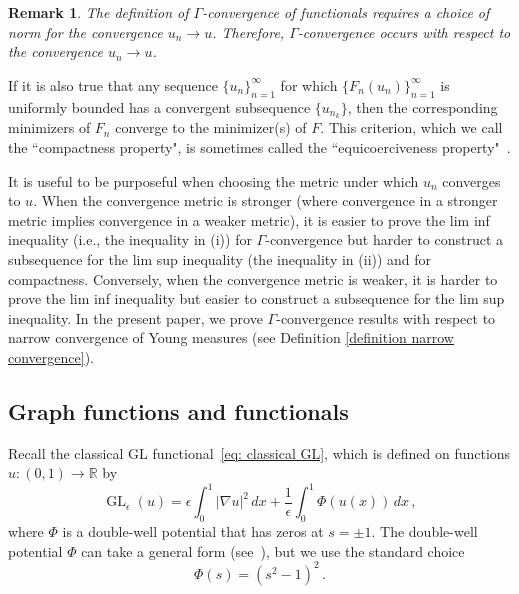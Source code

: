 \documentclass[11pt]{amsart}
\newtheorem{remark}{Remark}[section]
\def\R{\mathbb{R}}
\def\ep{\epsilon}
\def\ra{\rightarrow}
\def\GL{\operatorname{GL}}
\numberwithin{equation}{section}
\begin{document}
{\begin{remark}\label{remark: gamma convergence norm}
    The definition of $\Gamma$-convergence of functionals requires a choice of norm for the convergence $u_n \ra u$. Therefore, $\Gamma$-convergence occurs \emph{with respect to} the convergence $u_n \ra u$. 
\end{remark}

If it is also true that any sequence $\{u_n\}_{n = 1}^\infty$ for which $\{F_n(u_n)\}_{n=1}^\infty$ is uniformly bounded has a convergent subsequence $\{u_{n_k}\}$, then the corresponding minimizers of $F_n$ converge to the minimizer(s) of $F$. This criterion, which we call the ``compactness property", is sometimes called the ``equicoerciveness property"~\cite{van2012gamma}.

It is useful to be purposeful when choosing the metric under which $u_n$ converges to $u$. When the convergence metric is stronger (where convergence in a stronger metric implies convergence in a weaker metric), {it} is easier to prove the lim inf inequality (i.e., the inequality in (i)) for $\Gamma$-convergence but harder to construct a {sub}sequence for the lim sup inequality (the inequality in (ii)) and for compactness. Conversely, when the convergence metric is weaker, it is harder to prove the lim inf inequality but easier to construct a subsequence for the lim sup inequality. In the present paper, we prove $\Gamma$-convergence results with respect to narrow convergence of Young measures (see Definition \ref{definition narrow convergence}). 


\subsection{Graph functions and functionals}\label{sec: graph functionals}

Recall the classical GL functional~\eqref{eq: classical GL}, which is defined on functions $u: (0,1) \ra \R$ by 
\begin{equation}
	\GL_\ep(u) = \ep \int_0^1 |\nabla u|^2 \,dx + \frac{1}{\ep} \int_0^1 \Phi(u(x)) \,dx \,,
\end{equation}	
where $\Phi$ is a double-well potential that has zeros at $s = \pm 1$. The double-well potential $\Phi$ can take a general form {(see~\cite[assumptions ({\it W}$_1$)--({\it W}$_4$)]{van2012gamma}),} but we use the standard choice 
\begin{equation}
	\Phi(s) = (s^2 - 1)^2 \,.
\end{equation}	

}
\end{document}
